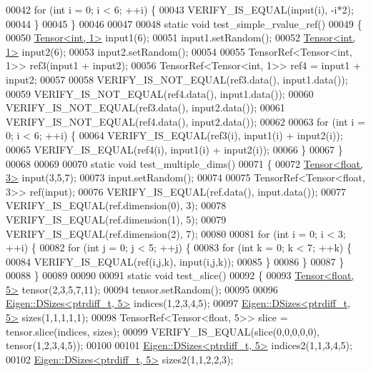 \begin{DoxyCode}
00042   \textcolor{keywordflow}{for} (\textcolor{keywordtype}{int} i = 0; i < 6; ++i) \{
00043     VERIFY\_IS\_EQUAL(input(i), -i*2);
00044   \}
00045 \}
00046 
00047 
00048 \textcolor{keyword}{static} \textcolor{keywordtype}{void} test\_simple\_rvalue\_ref()
00049 \{
00050   \hyperlink{class_eigen_1_1_tensor}{Tensor<int, 1>} input1(6);
00051   input1.setRandom();
00052   \hyperlink{class_eigen_1_1_tensor}{Tensor<int, 1>} input2(6);
00053   input2.setRandom();
00054 
00055   TensorRef<Tensor<int, 1>> ref3(input1 + input2);
00056   TensorRef<Tensor<int, 1>> ref4 = input1 + input2;
00057 
00058   VERIFY\_IS\_NOT\_EQUAL(ref3.data(), input1.data());
00059   VERIFY\_IS\_NOT\_EQUAL(ref4.data(), input1.data());
00060   VERIFY\_IS\_NOT\_EQUAL(ref3.data(), input2.data());
00061   VERIFY\_IS\_NOT\_EQUAL(ref4.data(), input2.data());
00062 
00063   \textcolor{keywordflow}{for} (\textcolor{keywordtype}{int} i = 0; i < 6; ++i) \{
00064     VERIFY\_IS\_EQUAL(ref3(i), input1(i) + input2(i));
00065     VERIFY\_IS\_EQUAL(ref4(i), input1(i) + input2(i));
00066   \}
00067 \}
00068 
00069 
00070 \textcolor{keyword}{static} \textcolor{keywordtype}{void} test\_multiple\_dims()
00071 \{
00072   \hyperlink{class_eigen_1_1_tensor}{Tensor<float, 3>} input(3,5,7);
00073   input.setRandom();
00074 
00075   TensorRef<Tensor<float, 3>> ref(input);
00076   VERIFY\_IS\_EQUAL(ref.data(), input.data());
00077   VERIFY\_IS\_EQUAL(ref.dimension(0), 3);
00078   VERIFY\_IS\_EQUAL(ref.dimension(1), 5);
00079   VERIFY\_IS\_EQUAL(ref.dimension(2), 7);
00080 
00081   \textcolor{keywordflow}{for} (\textcolor{keywordtype}{int} i = 0; i < 3; ++i) \{
00082     \textcolor{keywordflow}{for} (\textcolor{keywordtype}{int} j = 0; j < 5; ++j) \{
00083       \textcolor{keywordflow}{for} (\textcolor{keywordtype}{int} k = 0; k < 7; ++k) \{
00084         VERIFY\_IS\_EQUAL(ref(i,j,k), input(i,j,k));
00085       \}
00086     \}
00087   \}
00088 \}
00089 
00090 
00091 \textcolor{keyword}{static} \textcolor{keywordtype}{void} test\_slice()
00092 \{
00093   \hyperlink{class_eigen_1_1_tensor}{Tensor<float, 5>} tensor(2,3,5,7,11);
00094   tensor.setRandom();
00095 
00096   \hyperlink{struct_eigen_1_1_d_sizes}{Eigen::DSizes<ptrdiff\_t, 5>} indices(1,2,3,4,5);
00097   \hyperlink{struct_eigen_1_1_d_sizes}{Eigen::DSizes<ptrdiff\_t, 5>} sizes(1,1,1,1,1);
00098   TensorRef<Tensor<float, 5>> slice = tensor.slice(indices, sizes);
00099   VERIFY\_IS\_EQUAL(slice(0,0,0,0,0), tensor(1,2,3,4,5));
00100 
00101   \hyperlink{struct_eigen_1_1_d_sizes}{Eigen::DSizes<ptrdiff\_t, 5>} indices2(1,1,3,4,5);
00102   \hyperlink{struct_eigen_1_1_d_sizes}{Eigen::DSizes<ptrdiff\_t, 5>} sizes2(1,1,2,2,3);

\end{DoxyCode}
